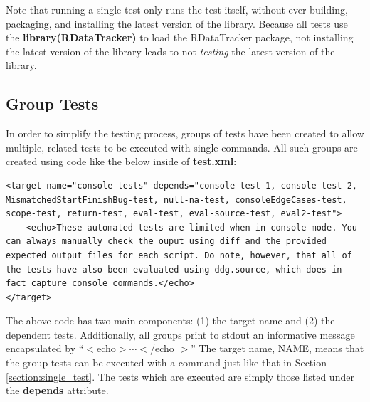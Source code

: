 \documentclass[12pt]{article}
\begin{document}
\bigskip

Note that running a single test only runs the test itself, without ever building, packaging, and installing the latest version of the library. Because all tests use the \textbf{library(RDataTracker)} to load the RDataTracker package, not installing the latest version of the library leads to not \textit{testing} the latest version of the library. 

\subsection{Group Tests}
In order to simplify the testing process, groups of tests have been created to allow multiple, related tests to be executed with single commands. All such groups are created using code like the below inside of \textbf{test.xml}:

\begin{lstlisting}
<target name="console-tests" depends="console-test-1, console-test-2, MismatchedStartFinishBug-test, null-na-test, consoleEdgeCases-test, scope-test, return-test, eval-test, eval-source-test, eval2-test">
	<echo>These automated tests are limited when in console mode. You can always manually check the ouput using diff and the provided expected output files for each script. Do note, however, that all of the tests have also been evaluated using ddg.source, which does in fact capture console commands.</echo>
</target>
\end{lstlisting}

The above code has two main components: (1) the target name and (2) the dependent tests. Additionally, all groups print to stdout an informative message encapsulated by ``$<$echo$> \cdots <$/echo $>$'' The target name, NAME, means that the group tests can be executed with a command just like that in Section \ref{section:single_test}. The tests which are executed are simply those listed under the \textbf{depends} attribute. 

\bigskip
\end{document}
